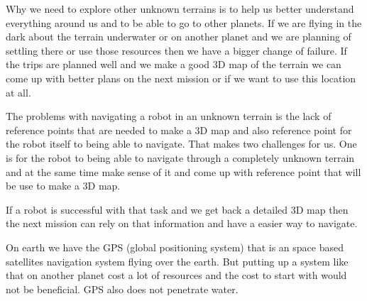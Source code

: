 Why we need to explore other unknown terrains is to help us better understand everything around us and to be able to go to other planets. If we are flying in the dark about the terrain underwater or on another planet and we are planning of settling there or use those resources then we have a bigger change of failure. If the trips are planned well and we make a good 3D map of the terrain we can come up with better plans on the next mission or if we want to use this location at all. 

The problems with navigating a robot in an unknown terrain is the lack of reference points that are needed to make a 3D map and also reference point for the robot itself to being able to navigate. That makes two challenges for us. One is for the robot to being able to navigate through a completely unknown terrain and at the same time make sense of it and come up with reference point that will be use to make a 3D map.

If a robot is successful with that task and we get back a detailed 3D map then the next mission can rely on that information and have a easier way to navigate. 

On earth we have the GPS (global positioning system) that is an space based satellites navigation system flying over the earth\cite{gpsgeneral}. But putting up a system like that on another planet cost a lot of resources and the cost to start with would not be beneficial. GPS also does not penetrate water\cite{underwatergps}. 












